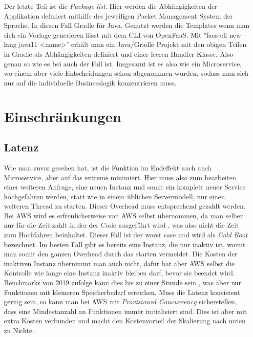 \documentclass[12pt, a4paper]{article}
\begin{document}
\newline
Der letzte Teil ist die \emph{Package list}.
Hier werden die Abhängigkeiten der Applikation definiert mithilfe des jeweiligen Packet Management System der Sprache.
In diesen Fall Gradle für Java.
\newline
Genutzt werden die Templates wenn man sich ein Vorlage generieren lässt mit dem CLI von OpenFaaS.
Mit "faas-cli new --lang java11 <name>" erhält man ein Java/Gradle Projekt mit den obigen Teilen in Gradle als Abhängigkeiten definiert und einer leeren Handler Klasse.
Also genau so wie es bei  auch der Fall ist.
\newline
Insgesamt ist es also wie ein Microservice, wo einem aber viele Entscheidungen schon abgenommen wurden, sodass man sich nur auf die individuelle Businesslogik konzentrieren muss.

\section{Einschränkungen}
\subsection{Latenz}
Wie man zuvor gesehen hat, ist die Funktion im Endeffekt auch auch Microservice, aber auf das extreme minimiert.
Hier muss also zum bearbeiten einer weiteren Anfrage, eine neuen Instanz und somit ein komplett neuer Service hochgefahren werden, statt wie in einem üblichen Servermodell, nur einen weiteren Thread zu starten.
\newline
Dieser Overhead muss entsprechend gezahlt werden.
Bei AWS wird es erfreulicherweise von AWS selbst übernommen, da man selber nur für die Zeit zahlt in der der Code ausgeführt wird \cite{aws_lambda_pricing}, was also nicht die Zeit zum Hochfahren beinhaltet.
Dieser Fall ist der worst case und wird als \emph{Cold Boot} bezeichnet.
Im besten Fall gibt es bereits eine Instanz, die nur inaktiv ist, womit man somit den ganzen Overhead durch das starten vermeidet.
Die Kosten der inaktiven Instanz übernimmt man auch nicht, dafür hat aber AWS selbst die Kontrolle wie lange eine Instanz inaktiv bleiben darf, bevor sie beendet wird.
Benchmarks von 2019 zufolge kann dies bis zu einer Stunde sein \cite{aws_lambda_idle_timeout}, was aber nur Funktionen mit kleineren Speicherbedarf erreichen.
\newline
Muss die Latenz konsistent gering sein, so kann man bei AWS mit \emph{Provisioned Concurrency} sicherstellen, dass eine Mindestanzahl an Funktionen immer initialisiert sind\cite{aws_lambda_provisioned_concurrency}.
Dies ist aber mit extra Kosten verbunden und macht den Kostenvorteil der Skalierung nach unten zu Nichte.
\end{document}
